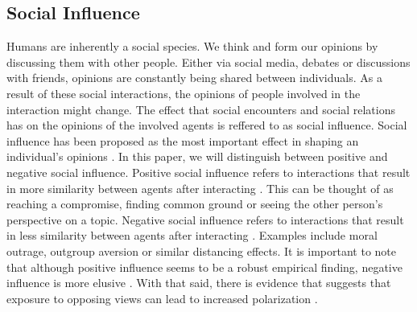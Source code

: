 \documentclass{article}
\begin{document}
\subsection{Social Influence}
Humans are inherently a social species. We think and form our opinions by discussing them with other people. 
Either via social media, debates or discussions with friends, opinions are constantly being shared between individuals. 
As a result of these social interactions, the opinions of people involved in the interaction might change. 
The effect that social encounters and social relations has on the opinions of the involved agents is reffered to as social influence. Social influence has been proposed as the most important effect in shaping an individual’s opinions \cite{chacoma_opinion_2015}. 
In this paper, we will distinguish between positive and negative social influence. Positive social influence refers to interactions that result in more similarity between agents after interacting \cite{flache_models_2017,levin_dynamics_2021}. 
This can be thought of as reaching a compromise, finding common ground or seeing the other person’s perspective on a topic. Negative social influence refers to interactions that result in less similarity between agents after interacting \cite{flache_models_2017}. 
Examples include moral outrage, outgroup aversion or similar distancing effects. It is important to note that although positive influence seems to be a robust empirical finding, negative influence is more elusive \cite{flache_models_2017,takacs_is_2014,turner_paths_2018}. 
With that said, there is evidence that suggests that exposure to opposing views can lead to increased polarization \cite{bail_exposure_2018}.
\end{document}
